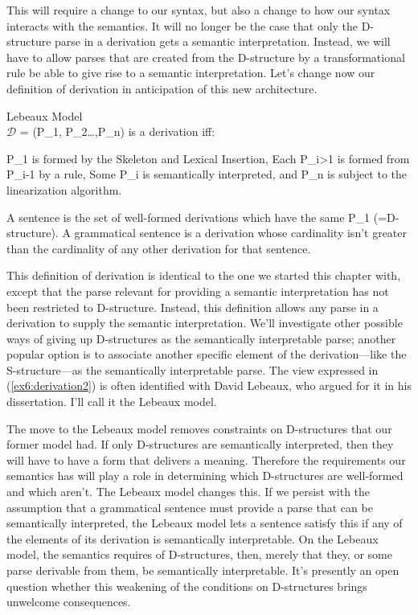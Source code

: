  This will require a change to our syntax, but also a change to how our syntax interacts with the semantics. It will no longer be the case that only the D-structure parse in a derivation gets a semantic interpretation. Instead, we will have to allow parses that are created from the D-structure by a transformational rule be able to give rise to a semantic interpretation. Let's change now our definition of derivation in anticipation of this new architecture.
 \pagebreak
\begin{exe}
	\raggedright
		\ex \label{ex6:derivation2} Lebeaux Model\\
			$\mathcal{D}$ = (P_1, P_2\ldots,P_n) is a derivation iff:
			\begin{xlist}
				\ex P_1 is formed by the  Skeleton and Lexical Insertion,
				\ex Each P_{i>1} is formed from P_{i-1} by a rule,
				\ex Some P_i is semantically interpreted, and
				\ex P_n is subject to the linearization algorithm.
			\end{xlist}
			\sn A sentence is the set of well-formed derivations which have the same P_1 (=D-structure). A grammatical sentence is a derivation whose cardinality isn't greater than the cardinality of any other derivation for that sentence.
	\end{exe}
%
%
%
This definition of derivation is identical to the one we started this chapter with, except that the parse relevant for providing a semantic interpretation has not been restricted to D-structure. Instead, this definition allows any parse in a derivation to supply the semantic interpretation. We'll investigate other possible ways of giving up D-structures as the semantically interpretable parse; another popular option is to associate another specific element of the derivation---like the S-structure---as the semantically interpretable parse. The view expressed in (\ref{ex6:derivation2}) is often identified with David Lebeaux,\cite{Lebeaux:1988,Lebeaux:2009} who argued for it in his dissertation. I'll call it the Lebeaux model.

The move to the Lebeaux model removes constraints on D-structures that our former model had. If only D-structures are semantically interpreted, then they will have to have a form that delivers a meaning. Therefore the requirements our semantics has will play a role in determining which D-structures are well-formed and which aren't. The Lebeaux model changes this. If we persist with the assumption that a grammatical sentence must provide a parse that can be semantically interpreted, the Lebeaux model lets a sentence satisfy this if any of the elements of its derivation is semantically interpretable. On the Lebeaux model, the semantics requires of D-structures, then, merely that they, or some parse derivable from them, be semantically interpretable. It's presently an open question whether this weakening of the conditions on D-structures brings unwelcome consequences.

